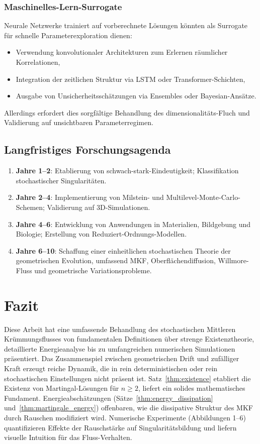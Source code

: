 \documentclass[a4paper,12pt]{article}
\theoremstyle{definition}
\begin{document}
\subsubsection{Maschinelles-Lern-Surrogate}

Neurale Netzwerke trainiert auf vorberechnete Lösungen könnten als Surrogate für schnelle Parameterexploration dienen:

\begin{itemize}
	\item Verwendung konvolutionaler Architekturen zum Erlernen räumlicher Korrelationen,
	\item Integration der zeitlichen Struktur via LSTM oder Transformer-Schichten,
	\item Ausgabe von Unsicherheitsschätzungen via Ensembles oder Bayesian-Ansätze.
\end{itemize}

Allerdings erfordert dies sorgfältige Behandlung des dimensionalitäts-Fluch und Validierung auf unsichtbaren Parameterregimen.

\subsection{Langfristiges Forschungsagenda}

\begin{enumerate}
	\item \textbf{Jahre 1--2}: Etablierung von schwach-stark-Eindeutigkeit; Klassifikation stochastischer Singularitäten.
	\item \textbf{Jahre 2--4}: Implementierung von Milstein- und Multilevel-Monte-Carlo-Schemen; Validierung auf 3D-Simulationen.
	\item \textbf{Jahre 4--6}: Entwicklung von Anwendungen in Materialien, Bildgebung und Biologie; Erstellung von Reduziert-Ordnungs-Modellen.
	\item \textbf{Jahre 6--10}: Schaffung einer einheitlichen stochastischen Theorie der geometrischen Evolution, umfassend MKF, Oberflächendiffusion, Willmore-Fluss und geometrische Variationsprobleme.
\end{enumerate}

\section{Fazit}

Diese Arbeit hat eine umfassende Behandlung des stochastischen Mittleren Krümmungs\-flusses von fundamentalen Definitionen über strenge Existenztheorie, detaillierte Energieanalyse bis zu umfangreichen numerischen Simulationen präsentiert. Das Zusammenspiel zwischen geometrischen Drift und zufälliger Kraft erzeugt reiche Dynamik, die in rein deterministischen oder rein stochastischen Einstellungen nicht präsent ist. Satz~\ref{thm:existence} etabliert die Existenz von Martingal-Lösungen für $n \geq 2$, liefert ein solides mathematisches Fundament. Energieabschätzungen (Sätze~\ref{thm:energy_dissipation} und~\ref{thm:martingale_energy}) offenbaren, wie die dissipative Struktur des MKF durch Rauschen modifiziert wird. Numerische Experimente (Abbildungen 1--6) quantifizieren Effekte der Rauschstärke auf Singularitätsbildung und liefern visuelle Intuition für das Fluss-Verhalten.
\end{document}
